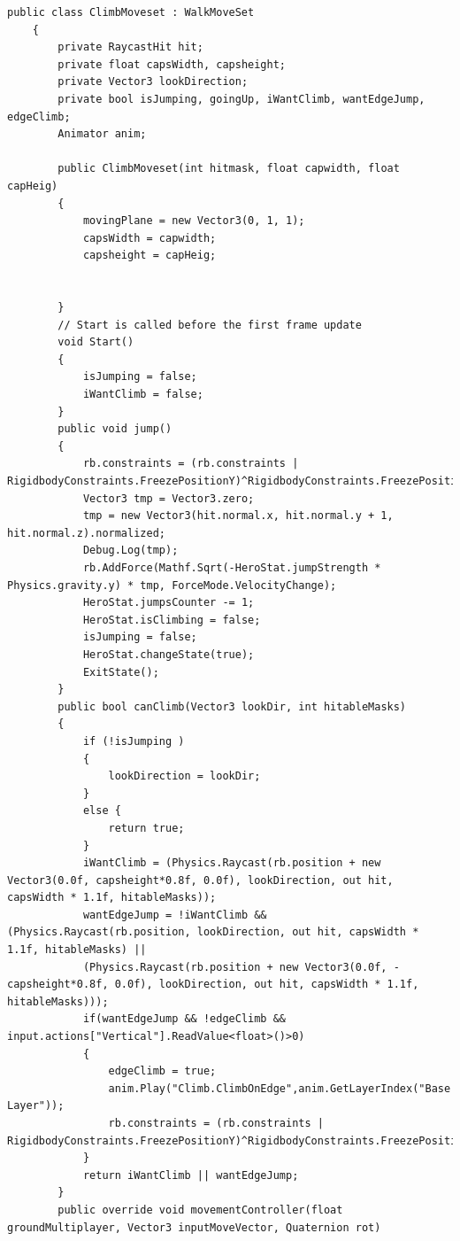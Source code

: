 \documentclass[12pt,twoside]{article}
\begin{document}
\begin{lstlisting}[language={[Sharp]C},caption=Skyrpt `ClimbMoveset' ,label={HeroScript:ClimbMoveset}]
    public class ClimbMoveset : WalkMoveSet
    {
        private RaycastHit hit;
        private float capsWidth, capsheight;
        private Vector3 lookDirection;
        private bool isJumping, goingUp, iWantClimb, wantEdgeJump, edgeClimb;
        Animator anim;
        
        public ClimbMoveset(int hitmask, float capwidth, float capHeig)
        {
            movingPlane = new Vector3(0, 1, 1);
            capsWidth = capwidth;
            capsheight = capHeig;
    
    
        }
        // Start is called before the first frame update
        void Start()
        {
            isJumping = false;
            iWantClimb = false;
        }
        public void jump()
        {
            rb.constraints = (rb.constraints | RigidbodyConstraints.FreezePositionY)^RigidbodyConstraints.FreezePositionY;
            Vector3 tmp = Vector3.zero;
            tmp = new Vector3(hit.normal.x, hit.normal.y + 1, hit.normal.z).normalized;
            Debug.Log(tmp);
            rb.AddForce(Mathf.Sqrt(-HeroStat.jumpStrength * Physics.gravity.y) * tmp, ForceMode.VelocityChange);
            HeroStat.jumpsCounter -= 1;
            HeroStat.isClimbing = false;
            isJumping = false;
            HeroStat.changeState(true);
            ExitState();
        }
        public bool canClimb(Vector3 lookDir, int hitableMasks)
        {
            if (!isJumping )
            {
                lookDirection = lookDir;
            }
            else {
                return true;
            }
            iWantClimb = (Physics.Raycast(rb.position + new Vector3(0.0f, capsheight*0.8f, 0.0f), lookDirection, out hit, capsWidth * 1.1f, hitableMasks));
            wantEdgeJump = !iWantClimb && (Physics.Raycast(rb.position, lookDirection, out hit, capsWidth * 1.1f, hitableMasks) ||
            (Physics.Raycast(rb.position + new Vector3(0.0f, -capsheight*0.8f, 0.0f), lookDirection, out hit, capsWidth * 1.1f, hitableMasks)));
            if(wantEdgeJump && !edgeClimb && input.actions["Vertical"].ReadValue<float>()>0)
            {
                edgeClimb = true;  
                anim.Play("Climb.ClimbOnEdge",anim.GetLayerIndex("Base Layer"));
                rb.constraints = (rb.constraints | RigidbodyConstraints.FreezePositionY)^RigidbodyConstraints.FreezePositionY;
            }
            return iWantClimb || wantEdgeJump;
        }
        public override void movementController(float groundMultiplayer, Vector3 inputMoveVector, Quaternion rot)

\end{lstlisting}
\end{document}
